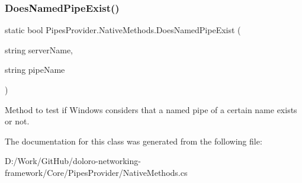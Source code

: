 \subsubsection{\texorpdfstring{Does\+Named\+Pipe\+Exist()}{DoesNamedPipeExist()}}
{\footnotesize\ttfamily static bool Pipes\+Provider.\+Native\+Methods.\+Does\+Named\+Pipe\+Exist (\begin{DoxyParamCaption}\item[{string}]{server\+Name,  }\item[{string}]{pipe\+Name }\end{DoxyParamCaption})\hspace{0.3cm}{\ttfamily [static]}}



Method to test if Windows considers that a named pipe of a certain name exists or not. 



The documentation for this class was generated from the following file\+:\begin{DoxyCompactItemize}
\item 
D\+:/\+Work/\+Git\+Hub/doloro-\/networking-\/framework/\+Core/\+Pipes\+Provider/Native\+Methods.\+cs\end{DoxyCompactItemize}

